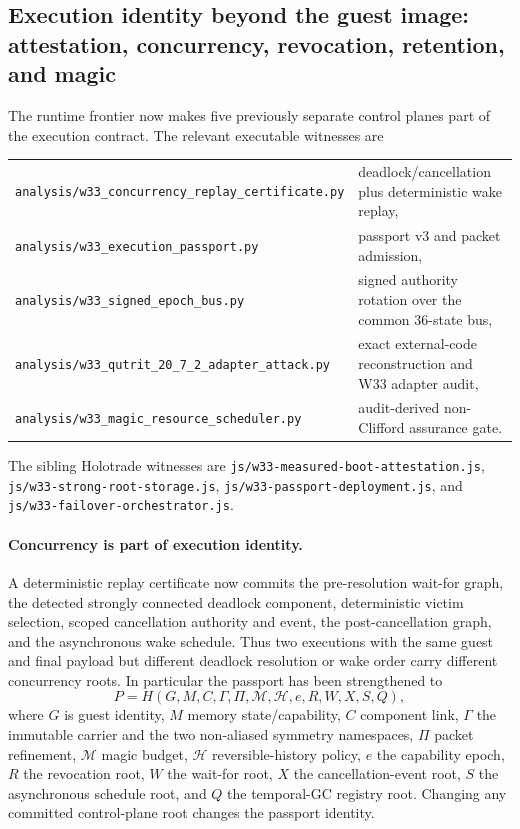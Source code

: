 \subsection{Execution identity beyond the guest image: attestation, concurrency, revocation, retention, and magic}
\label{sec:pass-20260902-attestation-epoch-storage-ft}

The runtime frontier now makes five previously separate control planes part of the execution contract.  The relevant executable witnesses are
\begin{center}
\begin{tabular}{ll}
\texttt{analysis/w33\_concurrency\_replay\_certificate.py} & deadlock/cancellation plus deterministic wake replay,\\
\texttt{analysis/w33\_execution\_passport.py} & passport v3 and packet admission,\\
\texttt{analysis/w33\_signed\_epoch\_bus.py} & signed authority rotation over the common 36-state bus,\\
\texttt{analysis/w33\_qutrit\_20\_7\_2\_adapter\_attack.py} & exact external-code reconstruction and W33 adapter audit,\\
\texttt{analysis/w33\_magic\_resource\_scheduler.py} & audit-derived non-Clifford assurance gate.
\end{tabular}
\end{center}
The sibling Holotrade witnesses are \texttt{js/w33-measured-boot-attestation.js},
\texttt{js/w33-strong-root-storage.js}, \texttt{js/w33-passport-deployment.js}, and
\texttt{js/w33-failover-orchestrator.js}.

\paragraph{Concurrency is part of execution identity.}
A deterministic replay certificate now commits the pre-resolution wait-for graph, the detected strongly connected deadlock component, deterministic victim selection, scoped cancellation authority and event, the post-cancellation graph, and the asynchronous wake schedule.  Thus two executions with the same guest and final payload but different deadlock resolution or wake order carry different concurrency roots.  In particular the passport has been strengthened to
\[
 P=H( G,M,C,\Gamma,\Pi,\mathcal M,\mathcal H,
       e,R,W,X,S,Q ),
\]
where $G$ is guest identity, $M$ memory state/capability, $C$ component link,
$\Gamma$ the immutable carrier and the two non-aliased symmetry namespaces,
$\Pi$ packet refinement, $\mathcal M$ magic budget, $\mathcal H$ reversible-history policy,
$e$ the capability epoch, $R$ the revocation root, $W$ the wait-for root,
$X$ the cancellation-event root, $S$ the asynchronous schedule root, and $Q$ the temporal-GC registry root.
Changing any committed control-plane root changes the passport identity.

